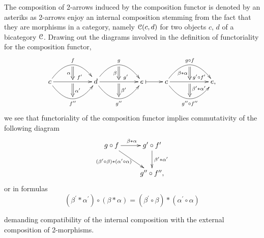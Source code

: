   \begin{rem}
    The composition of 2-arrows induced by the composition functor is denoted by an asteriks as 2-arrows enjoy an internal composition stemming from the fact that they are morphisms in a category, namely $\mathcal{C}(c,d)$ for two objects $c,\,d$ of a bicategory $\mathcal{C}$. Drawing out the diagrams involved in the definition of functoriality for the composition functor,
    \begin{gather*}
        \xymatrix{
          c%
            \ar@/^2pc/[rr]^{f}_{}="f" 
            \ar[rr]^{}="f_prime_upper"^(.65){f^\prime}_{}="f_prime_lower"
            \ar@/_2pc/[rr]_{f^\dprime}^{}="f_dprime" 
              \ar@{=>} "f";"f_prime_upper" _{\alpha}
              \ar@{=>} "f_prime_lower";"f_dprime" ^{\alpha^\prime}
          &
          &
          d%
            \ar@/^2pc/[rr]^{g}_{}="g"
            \ar[rr]^{}="g_prime_upper"^(.65){g^\prime}_{}="g_prime_lower"
            \ar@/_2pc/[rr]_{g^\dprime}^{}="g_dprime"
              \ar@{=>} "g";"g_prime_upper" _{\beta}
              \ar@{=>} "g_prime_lower";"g_dprime" ^{\beta^\prime}
          &
          &
          e%
            \ar@{|->}[r]
          &
          c%
            \ar@/^2pc/[rr]^{g \circ f}_{}="gf"
            \ar[rr]^{}="gf_prime_upper"^(.7){g^\prime \circ f^\prime}_{}="gf_prime_lower"
            \ar@/_2pc/[rr]_{g^\dprime \circ f^\dprime}^{}="gf_dprime"
              \ar@{=>} "gf";"gf_prime_upper" _{\beta \ast \alpha}
              \ar@{=>} "gf_prime_lower";"gf_dprime" ^(.4){\beta^\prime \ast \alpha^\prime}
          &&
          e,%
        }
      \end{gather*}
    we see that functoriality of the composition functor implies commutativity of the following diagram
    \begin{gather*}
      \xymatrix{
        g \circ f
          \ar[r]^{\beta \ast \alpha}
          \ar[dr]_(.4){(\beta^\prime \circ \beta) \ast (\alpha^\prime \circ \alpha)}
        &
        g^\prime \circ f^\prime
          \ar[d]^{\beta^\prime \ast \alpha^\prime}
        \\
        &
        g^\dprime \circ f^\dprime,
      }
    \end{gather*}
    or in formulas
    \begin{displaymath}
      (\beta^\prime \ast \alpha^\prime) \circ (\beta \ast \alpha) = (\beta^\prime \circ \beta) \ast (\alpha^\prime \circ \alpha)
    \end{displaymath}

    demanding compatibility of the internal composition with the external composition of 2-morphisms.
  \end{rem}

